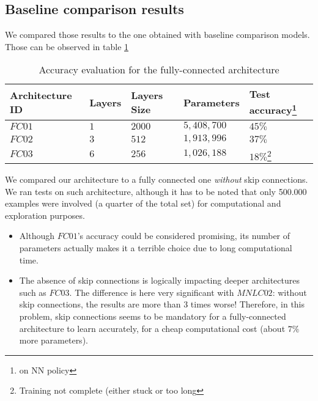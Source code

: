 \documentclass{article}
\begin{document}
\subsection{Baseline comparison results}

We compared those results to the one obtained with baseline comparison models.
Those can be observed in table \ref {Baseline:mainEvalTable}


\begin{table}[ht]

\caption{Accuracy evaluation for the fully-connected architecture}
	\centering
	\begin{tabular}{|p{2.5cm}||p{1.5cm}|p{2cm}||p{2.5cm}||p{2.5cm}|  }
	
 	\hline
 	Architecture ID & Layers & Layers Size & Parameters & Test accuracy\footnote{on NN policy}\\
 	\hline
 	$FC01$ & $1$ & $2000$ & $5,408,700$  &   $45\%$\\
 	$FC02$ & $3$	& $512$ & $1,913,996$ & $37\%$\\
 	$FC03$ & $6$   & $256$ & $1,026,188$ & $18\%$\footnote{\label{note1}Training not complete 	(either stuck or too long}\\
 	\hline
 	
	\end{tabular}
	\label{Baseline:mainEvalTable}
\end{table}

We compared our architecture to a fully connected one \emph{without} skip connections.
We ran tests on such architecture, 
although it has to be noted that only 500.000 examples were involved (a quarter of the total set)
for computational and exploration purposes.
\begin{itemize}

\item Although $FC01$'s accuracy could be considered promising, 
its number of parameters actually makes it a terrible choice due to long computational time.

\item The absence of skip connections is logically impacting deeper architectures 
such as $FC03$.
The difference is here very significant with $MNLC02$: without skip connections, the results are more than 3 times worse!
Therefore, in this problem, skip connections seems to be mandatory for a fully-connected architecture to learn accurately, 
for a cheap computational cost (about $7\%$ more parameters).
\end{itemize}
\end{document}
